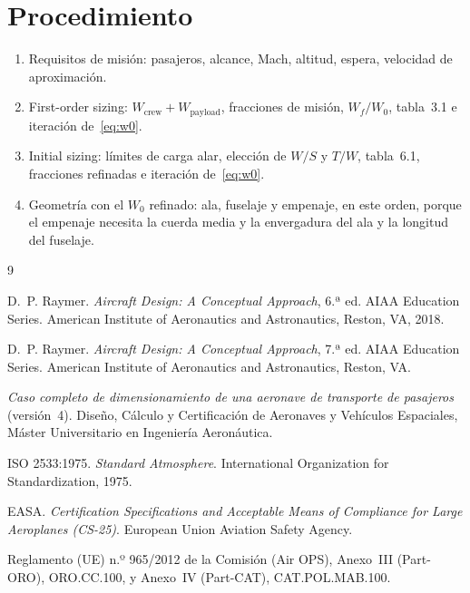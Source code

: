 \documentclass[11pt,a4paper]{article}
\newcommand{\WO}{W_0}
\begin{document}
\section{Procedimiento}
\begin{enumerate}
  \item Requisitos de misión: pasajeros, alcance, Mach, altitud, espera,
        velocidad de aproximación.
  \item First-order sizing: $W_\text{crew}+W_\text{payload}$, fracciones de
        misión, $W_f/\WO$, tabla~3.1 e iteración de~\eqref{eq:w0}.
  \item Initial sizing: límites de carga alar, elección de $W/S$ y $T/W$,
        tabla~6.1, fracciones refinadas e iteración de~\eqref{eq:w0}.
  \item Geometría con el $\WO$ refinado: ala, fuselaje y empenaje, en este
        orden, porque el empenaje necesita la cuerda media y la envergadura
        del ala y la longitud del fuselaje.
\end{enumerate}

\begin{thebibliography}{9}

D.~P. Raymer.
\newblock \emph{Aircraft Design: A Conceptual Approach}, 6.ª ed.
\newblock AIAA Education Series. American Institute of Aeronautics and
  Astronautics, Reston, VA, 2018.

D.~P. Raymer.
\newblock \emph{Aircraft Design: A Conceptual Approach}, 7.ª ed.
\newblock AIAA Education Series. American Institute of Aeronautics and
  Astronautics, Reston, VA.

\emph{Caso completo de dimensionamiento de una aeronave de transporte de
  pasajeros} (versión~4).
\newblock Diseño, Cálculo y Certificación de Aeronaves y Vehículos
  Espaciales, Máster Universitario en Ingeniería Aeronáutica.

ISO 2533:1975.
\newblock \emph{Standard Atmosphere}.
\newblock International Organization for Standardization, 1975.

EASA.
\newblock \emph{Certification Specifications and Acceptable Means of
  Compliance for Large Aeroplanes (CS-25)}.
\newblock European Union Aviation Safety Agency.

Reglamento (UE) n.º 965/2012 de la Comisión (Air OPS), Anexo~III (Part-ORO),
ORO.CC.100, y Anexo~IV (Part-CAT), CAT.POL.MAB.100.

\end{thebibliography}
\end{document}
